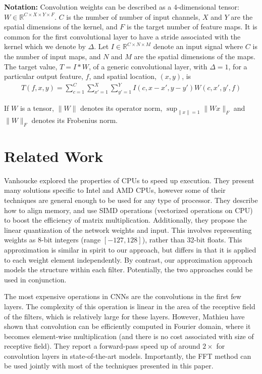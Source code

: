  \noindent \textbf{Notation:} Convolution weights can be described as
 a $4$-dimensional tensor: $W \in \mathbb{R}^{C \times X \times Y
   \times F}$. $C$ is the number of number of input channels, $X$ and
 $Y$ are the spatial dimensions of the kernel, and $F$ is the target
 number of feature maps. 
 It is common for the first convolutional layer to have a stride associated with the kernel which we denote by $\Delta$.  Let $I \in \mathbb{R}^{C \times N \times M}$
 denote an input signal where $C$ is the number of input maps, and $N$
 and $M$ are the spatial dimensions of the maps.  The target value, $T
 = I \ast W$, of a generic convolutional layer, with $\Delta = 1$, for a particular output
 feature, $f$, and spatial location, $(x, y)$, is
\begin{align*}
\label{convlayereq}
T(f,x,y) = \sum_{c=1}^C \sum_{x'=1}^{X} \sum_{y'=1}^{Y} I(c,x-x',y-y') W(c,x',y',f)
\end{align*}

If $W$ is a tensor, $\|W \|$ denotes its operator norm, $\sup_{\|x\|=1}\|Wx\|_F $ and $\|W \|_F$ denotes its Frobenius norm.

\section{Related Work}
\label{relwork}

Vanhoucke \etal \cite{vanhoucke2011improving} explored the
properties of CPUs to speed up execution.  They present many solutions
specific to Intel and AMD CPUs, however some of their techniques are
general enough to be used for any type of processor.  They describe
how to align memory, and use SIMD operations (vectorized operations on
CPU) to boost the efficiency of matrix multiplication.  Additionally, they
propose the linear quantization of the network weights and input. This
involves representing weights as 8-bit integers (range
$[-127, 128]$), rather than 32-bit floats. This approximation is
similar in spirit to our approach, but differs in that it is applied
to each weight element independently. By contrast, our approximation approach models
the structure within each filter. Potentially, the two approaches
could be used in conjunction. 

The most expensive operations in CNNs are the
convolutions in the first few layers. The complexity of this operation
is linear in the area of the receptive field of the filters, which is
relatively large for these layers.  However, Mathieu \etal \cite{mathieu2013fast} have shown that convolution can be
efficiently computed in Fourier domain, where it becomes element-wise
multiplication (and there is no cost associated with size of receptive
field). They report a forward-pass speed up of around $2\times$ for
convolution layers in state-of-the-art models. Importantly, the FFT method can
be used jointly with most of the techniques presented in this paper.

